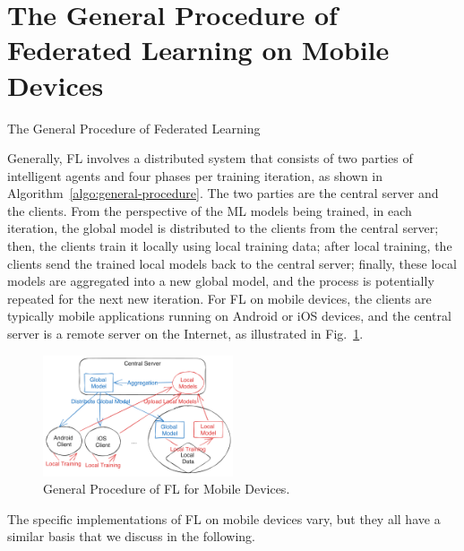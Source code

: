 \documentclass[conference]{IEEEtran}
\begin{document}
\section{The General Procedure of Federated Learning on Mobile Devices}

\label{sec:general-procedure}

\begin{algorithm}
  \caption{The General Procedure of Federated Learning}
  \label{algo:general-procedure}
\end{algorithm}

Generally, FL involves a distributed system that
consists of two parties of intelligent agents and
four phases per training iteration,
as shown in Algorithm~\ref{algo:general-procedure}.
The two parties are the central server and the clients.
From the perspective of the ML models being trained,
in each iteration,
the global model is distributed to the clients from the central server;
then, the clients train it locally using local training data;
after local training,
the clients send the trained local models back to the central server;
finally, these local models are aggregated into a new global model,
and the process is potentially repeated for the next new iteration.
For FL on mobile devices,
the clients are typically mobile applications running on Android or iOS devices,
and the central server is a remote server on the Internet,
as illustrated in Fig.~\ref{fig:general-fl}.

\begin{figure}
\centerline{
    \includegraphics[width=0.5\textwidth]{general-fl.png}
}
\caption{General Procedure of FL for Mobile Devices.}
\label{fig:general-fl}
\end{figure}

The specific implementations of FL on mobile devices vary,
but they all have a similar basis that we discuss in the following.
\end{document}
